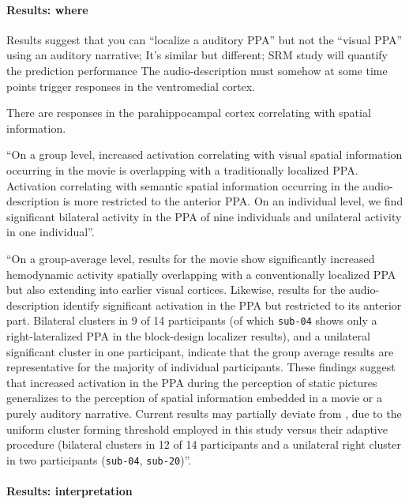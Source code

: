 \paragraph{Results: where}

%
Results suggest that you can ``localize a auditory PPA'' but not the ``visual
PPA'' using an auditory narrative; It's similar but different; SRM study will
quantify the prediction performance
%
The audio-description must somehow at some time points trigger responses in the
ventromedial cortex.

%
There are responses in the parahippocampal cortex correlating with
spatial information.

``On a group level, increased activation correlating with visual spatial
information occurring in the movie is overlapping with a traditionally localized
PPA.
Activation correlating with semantic spatial information occurring in the
audio-description is more restricted to the anterior PPA.
On an individual level, we find significant bilateral activity in the PPA of
nine individuals and unilateral activity in one individual''.

``On a group-average level, results for the movie show significantly increased
hemodynamic activity spatially overlapping with a conventionally localized PPA
but also extending into earlier visual cortices.
Likewise, results for the audio-description identify significant activation in
the PPA but restricted to its anterior part.
Bilateral clusters in 9 of 14 participants (of which \texttt{sub-04} shows only
a right-lateralized PPA in the block-design localizer results), and a unilateral
significant cluster in one participant, indicate that the group average results
are representative for the majority of individual participants.
These findings suggest that increased activation in the PPA during the
perception of static pictures generalizes to the perception of spatial
information embedded in a movie or a purely auditory narrative.
%
Current results may partially deviate from \citet{sengupta2016extension}, due to
the uniform cluster forming threshold employed in this study versus their
adaptive procedure (bilateral clusters in 12 of 14 participants and a unilateral
right cluster in two participants (\texttt{sub-04}, \texttt{sub-20})''.


\paragraph{Results: interpretation}

